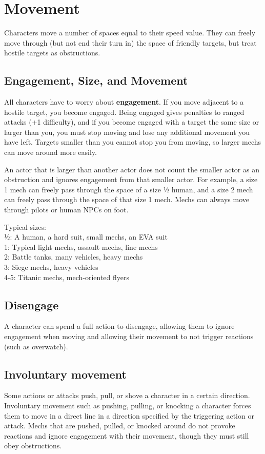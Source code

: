 \section{Movement}

Characters move a number of spaces equal to their speed value. They can freely move through (but not end their turn in) the space of friendly targets, but treat hostile targets as obstructions. 

\subsection{Engagement, Size, and Movement}

All characters have to worry about \textbf{engagement}. If you move adjacent to a hostile target, you become engaged. Being engaged gives penalties to ranged attacks (+1 difficulty), and if you become engaged with a target the same size or larger than you, you must stop moving and lose any additional movement you have left. Targets smaller than you cannot stop you from moving, so larger mechs can move around more easily.

An actor that is larger than another actor does not count the smaller actor as an obstruction and ignores engagement from that smaller actor. For example, a size 1 mech can freely pass through the space of a size ½ human, and a size 2 mech can freely pass through the space of that size 1 mech. Mechs can always move through pilots or human NPCs on foot.

Typical sizes:\\
½: A human, a hard suit, small mechs, an EVA suit\\
1: Typical light mechs, assault mechs, line mechs\\
2: Battle tanks, many vehicles, heavy mechs\\
3: Siege mechs, heavy vehicles\\
4-5: Titanic mechs, mech-oriented flyers

\subsection{Disengage}
A character can spend a full action to disengage, allowing them to ignore engagement when moving and allowing their movement to not trigger reactions (such as overwatch).

\subsection{Involuntary movement}
Some actions or attacks push, pull, or shove a character in a certain direction. Involuntary movement such as pushing, pulling, or knocking a character forces them to move in a direct line in a direction specified by the triggering action or attack. Mechs that are pushed, pulled, or knocked around do not provoke reactions and ignore engagement with their movement, though they must still obey obstructions.

